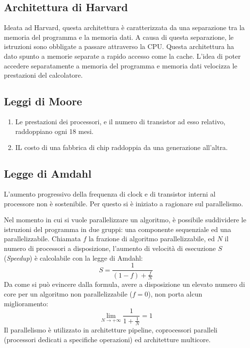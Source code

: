 \documentclass[../ace.tex]{subfiles}
\begin{document}
\subsection{Architettura di Harvard} \label{sec:architettura_harvard}
\begin{figure}[h]
    \centering
\end{figure}

\noindent
Ideata ad Harvard, questa architettura è caratterizzata da una separazione tra la memoria del programma e la memoria dati.
A causa di questa separazione, le istruzioni sono obbligate a passare attraverso la CPU.
Questa architettura ha dato spunto a memorie separate a rapido accesso come la cache.
L'idea di poter accedere separatamente a memoria del programma e memoria dati velocizza le prestazioni del calcolatore.

\subsection{Leggi di Moore}
\begin{enumerate}
    \item Le prestazioni dei processori, e il numero di transistor ad esso relativo, raddoppiano ogni 18 mesi.
    \item IL costo di una fabbrica di chip raddoppia da una generazione all'altra.
\end{enumerate}

\subsection{Legge di Amdahl}
L'aumento progressivo della frequenza di clock e di transistor interni al processore non è sostenibile.
Per questo si è iniziato a ragionare sul parallelismo.

Nel momento in cui si vuole parallelizzare un algoritmo, è possibile suddividere le istruzioni del programma in due gruppi: una componente sequenziale ed una parallelizzabile.
Chiamata $f$ la frazione di algoritmo parallelizzabile, ed $N$ il numero di processori a disposizione, l'aumento di
velocità di esecuzione $S$ (\textit{Speedup}) è calcolabile con la legge di Amdahl:
\[
    S = \frac{1}{(1 - f) + \frac{f}{N}}
\]
Da come si può evincere dalla formula, avere a disposizione un elevato numero di core per un algoritmo non parallelizzabile ($f = 0$), non porta alcun miglioramento:
\[
    \lim_{N \to +\infty} \frac{1}{1 + \frac{1}{N}} = 1
\]
Il parallelismo è  utilizzato in architetture pipeline, coprocessori paralleli (processori dedicati a specifiche operazioni) ed architetture multicore.
\end{document}
